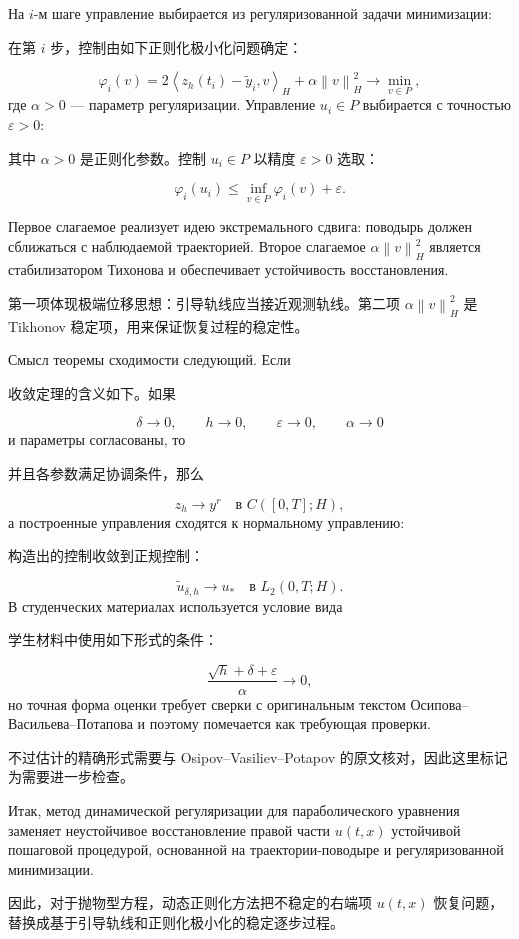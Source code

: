 \documentclass[12pt,a4paper]{article}
\newcommand{\norm}[1]{\left\lVert #1\right\rVert}
\newcommand{\inner}[2]{\left\langle #1,#2\right\rangle}
\newcommand{\zh}[1]{\par\noindent #1\par}
\begin{document}
На $i$-м шаге управление выбирается из регуляризованной задачи минимизации:
\zh{在第 $i$ 步，控制由如下正则化极小化问题确定：}
\begin{equation}
    \varphi_i(v)
    =2\inner{z_h(t_i)-\tilde y_i}{v}_H
    +\alpha\norm{v}_H^2
    \to \min_{v\in P},
\end{equation}
где $\alpha>0$ --- параметр регуляризации. Управление $u_i\in P$ выбирается с точностью $\varepsilon>0$:
\zh{其中 $\alpha>0$ 是正则化参数。控制 $u_i\in P$ 以精度 $\varepsilon>0$ 选取：}
\begin{equation}
    \varphi_i(u_i)\le \inf_{v\in P}\varphi_i(v)+\varepsilon.
\end{equation}

Первое слагаемое реализует идею экстремального сдвига: поводырь должен сближаться с наблюдаемой траекторией. Второе слагаемое $\alpha\norm{v}_H^2$ является стабилизатором Тихонова и обеспечивает устойчивость восстановления.
\zh{第一项体现极端位移思想：引导轨线应当接近观测轨线。第二项 $\alpha\norm{v}_H^2$ 是 Tikhonov 稳定项，用来保证恢复过程的稳定性。}

Смысл теоремы сходимости следующий. Если
\zh{收敛定理的含义如下。如果}
\[
    \delta\to0,
    \qquad h\to0,
    \qquad \varepsilon\to0,
    \qquad \alpha\to0
\]
и параметры согласованы, то
\zh{并且各参数满足协调条件，那么}
\begin{equation}
    z_h\to y^r \quad\text{в } C([0,T];H),
\end{equation}
а построенные управления сходятся к нормальному управлению:
\zh{构造出的控制收敛到正规控制：}
\begin{equation}
    \tilde u_{\delta,h}\to u_* \quad\text{в } L_2(0,T;H).
\end{equation}
В студенческих материалах используется условие вида
\zh{学生材料中使用如下形式的条件：}
\begin{equation}
    \frac{\sqrt h+\delta+\varepsilon}{\alpha}\to0,
\end{equation}
но точная форма оценки требует сверки с оригинальным текстом Осипова--Васильева--Потапова и поэтому помечается как требующая проверки.
\zh{不过估计的精确形式需要与 Osipov--Vasiliev--Potapov 的原文核对，因此这里标记为需要进一步检查。}

Итак, метод динамической регуляризации для параболического уравнения заменяет неустойчивое восстановление правой части $u(t,x)$ устойчивой пошаговой процедурой, основанной на траектории-поводыре и регуляризованной минимизации.
\zh{因此，对于抛物型方程，动态正则化方法把不稳定的右端项 $u(t,x)$ 恢复问题，替换成基于引导轨线和正则化极小化的稳定逐步过程。}
\end{document}
